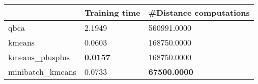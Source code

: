 \begin{table}[htbp]
\centering
\begin{tabular}{lll}
\toprule
 & Training time & #Distance computations \\
\midrule
qbca & 2.1949 & 560991.0000 \\
kmeans & 0.0603 & 168750.0000 \\
kmeans_plusplus & \textbf{0.0157} & 168750.0000 \\
minibatch_kmeans & 0.0733 & \textbf{67500.0000} \\
\bottomrule
\end{tabular}
\end{table}
